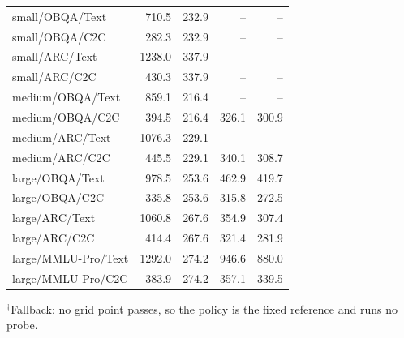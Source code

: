 \begin{table}[h]
\begin{tabular}{lrrrr}
small/OBQA/Text & 710.5 & 232.9 & -- & --\\
small/OBQA/C2C & 282.3 & 232.9 & -- & --\\
small/ARC/Text & 1238.0 & 337.9 & -- & --\\
small/ARC/C2C & 430.3 & 337.9 & -- & --\\
medium/OBQA/Text & 859.1 & 216.4 & -- & --\\
medium/OBQA/C2C & 394.5 & 216.4 & 326.1 & 300.9\\
medium/ARC/Text & 1076.3 & 229.1 & -- & --\\
medium/ARC/C2C & 445.5 & 229.1 & 340.1 & 308.7\\
large/OBQA/Text & 978.5 & 253.6 & 462.9 & 419.7\\
large/OBQA/C2C & 335.8 & 253.6 & 315.8 & 272.5\\
large/ARC/Text & 1060.8 & 267.6 & 354.9 & 307.4\\
large/ARC/C2C & 414.4 & 267.6 & 321.4 & 281.9\\
large/MMLU-Pro/Text & 1292.0 & 274.2 & 946.6 & 880.0\\
large/MMLU-Pro/C2C & 383.9 & 274.2 & 357.1 & 339.5\\
\bottomrule\end{tabular}
\par\smallskip\raggedright $^\dagger$Fallback: no grid point passes, so the policy is the fixed reference and runs no probe.
\end{table}
